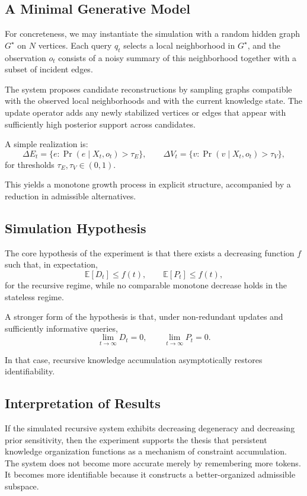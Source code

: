 \documentclass[12pt, oneside]{article}
\theoremstyle{plain}
\theoremstyle{definition}
\theoremstyle{remark}
\begin{document}
\subsection{A Minimal Generative Model}

For concreteness, we may instantiate the simulation with a random hidden graph $G^\star$ on $N$ vertices. Each query $q_t$ selects a local neighborhood in $G^\star$, and the observation $o_t$ consists of a noisy summary of this neighborhood together with a subset of incident edges.

The system proposes candidate reconstructions by sampling graphs compatible with the observed local neighborhoods and with the current knowledge state. The update operator adds any newly stabilized vertices or edges that appear with sufficiently high posterior support across candidates.

A simple realization is:
\[
\Delta E_t = \{ e : \Pr(e \mid X_t, o_t) > \tau_E \},
\qquad
\Delta V_t = \{ v : \Pr(v \mid X_t, o_t) > \tau_V \},
\]
for thresholds $\tau_E, \tau_V \in (0,1)$.

This yields a monotone growth process in explicit structure, accompanied by a reduction in admissible alternatives.

\subsection{Simulation Hypothesis}

The core hypothesis of the experiment is that there exists a decreasing function $f$ such that, in expectation,
\[
\mathbb{E}[D_t] \le f(t),
\qquad
\mathbb{E}[P_t] \le f(t),
\]
for the recursive regime, while no comparable monotone decrease holds in the stateless regime.

A stronger form of the hypothesis is that, under non-redundant updates and sufficiently informative queries,
\[
\lim_{t \to \infty} D_t = 0,
\qquad
\lim_{t \to \infty} P_t = 0.
\]

In that case, recursive knowledge accumulation asymptotically restores identifiability.

\subsection{Interpretation of Results}

If the simulated recursive system exhibits decreasing degeneracy and decreasing prior sensitivity, then the experiment supports the thesis that persistent knowledge organization functions as a mechanism of constraint accumulation. The system does not become more accurate merely by remembering more tokens. It becomes more identifiable because it constructs a better-organized admissible subspace.
\end{document}
